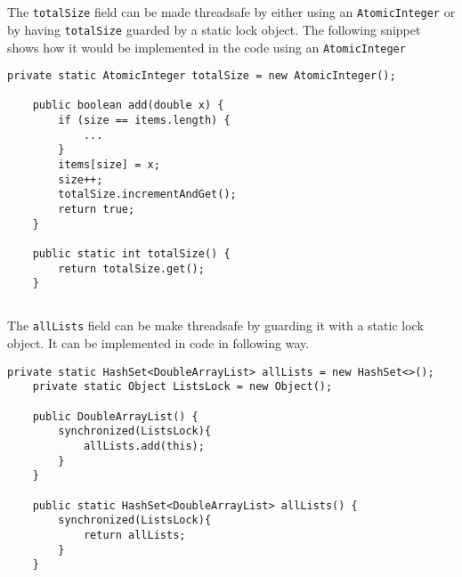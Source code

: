 \documentclass{ituhandin}
\begin{document}
\chapter{} %
\section{}
The \texttt{totalSize} field can be made threadsafe by either using an \texttt{AtomicInteger} or by having \texttt{totalSize} guarded by a static lock object. The following snippet shows how it would be implemented in the code using an \texttt{AtomicInteger}

\begin{lstlisting}[frame={}]
    private static AtomicInteger totalSize = new AtomicInteger();

    public boolean add(double x) {
        if (size == items.length) {
            ...
        }
        items[size] = x;
        size++;
        totalSize.incrementAndGet();
        return true;
    }

    public static int totalSize() {
        return totalSize.get();
    }
\end{lstlisting}

\section{}
The \texttt{allLists} field can be make threadsafe by guarding it with a static lock object. It can be implemented in code in following way.
\begin{lstlisting}[frame={}]
    private static HashSet<DoubleArrayList> allLists = new HashSet<>();
    private static Object ListsLock = new Object();

    public DoubleArrayList() {
        synchronized(ListsLock){
            allLists.add(this);
        }
    }

    public static HashSet<DoubleArrayList> allLists() {
        synchronized(ListsLock){
            return allLists;
        }
    }
\end{lstlisting}

\chapter{} %
\end{document}
